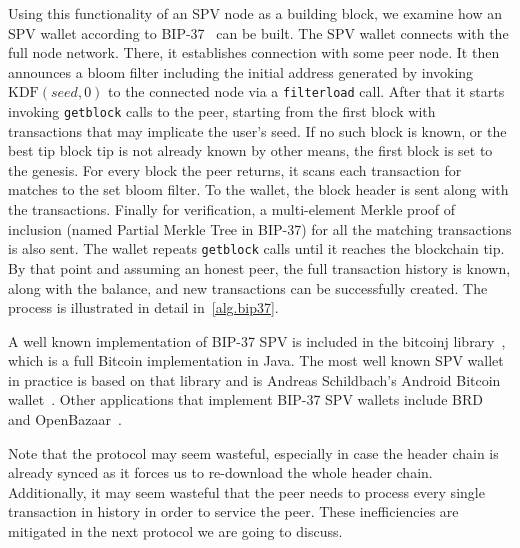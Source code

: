 Using this functionality of an SPV node as a building block, we examine how an SPV wallet according to BIP-37~\cite{bip37} can be built. The SPV wallet connects with the full node network. There, it establishes connection with some peer node. It then announces a bloom filter including the initial address generated by invoking $\text{KDF}(seed, 0)$ to the connected node via a \texttt{filterload} call. After that it starts invoking \texttt{getblock} calls to the peer, starting from the first block with transactions that may implicate the user's seed. If no such block is known, or the best tip block tip is not already known by other means, the first block is set to the genesis. For every block the peer returns, it scans each transaction for matches to the set bloom filter. To the wallet, the block header is sent along with the transactions. Finally for verification, a multi-element Merkle proof of inclusion (named Partial Merkle Tree in BIP-37) for all the matching transactions is also sent. The wallet repeats \texttt{getblock} calls until it reaches the blockchain tip. By that point and assuming an honest peer, the full transaction history is known, along with the balance, and new transactions can be successfully created. The process is illustrated in detail in~\cref{alg.bip37}.




A well known implementation of BIP-37 SPV is included in the bitcoinj library~\cite{bitcoinj}, which is a full Bitcoin implementation in Java. The most well known SPV wallet in practice is based on that library and is Andreas Schildbach's Android Bitcoin wallet~\cite{schildbach}. Other applications that implement BIP-37 SPV wallets include BRD~\cite{brd} and OpenBazaar~\cite{openbazaar}.

Note that the protocol may seem wasteful, especially in case the header chain is already synced as it forces us to re-download the whole header chain. Additionally, it may seem wasteful that the peer needs to process every single transaction in history in order to service the peer. These inefficiencies are mitigated in the next protocol we are going to discuss.


